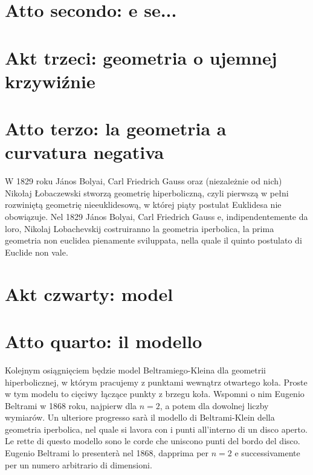 \section{Atto secondo: e se...} %





\section{Akt trzeci: geometria o ujemnej krzywiźnie} %
\section{Atto terzo: la geometria a curvatura negativa} %
W 1829 roku János Bolyai, Carl Friedrich Gauss oraz (niezależnie od nich) Nikołaj Łobaczewski stworzą geometrię hiperboliczną, czyli pierwszą w pełni rozwiniętą geometrię nieeuklidesową, w której piąty postulat Euklidesa nie obowiązuje. %
Nel 1829 János Bolyai, Carl Friedrich Gauss e, indipendentemente da loro, Nikolaj Lobachevskij costruiranno la geometria iperbolica, la prima geometria non euclidea pienamente sviluppata, nella quale il quinto postulato di Euclide non vale. %




\section{Akt czwarty: model} %
\section{Atto quarto: il modello} %
Kolejnym osiągnięciem będzie model Beltramiego-Kleina dla geometrii hiperbolicznej, w którym pracujemy z punktami wewnątrz otwartego koła. %
Proste w tym modelu to cięciwy łączące punkty z brzegu koła. %
Wspomni o nim Eugenio Beltrami w 1868 roku, najpierw dla $n = 2$, a potem dla dowolnej liczby wymiarów. %
Un ulteriore progresso sarà il modello di Beltrami-Klein della geometria iperbolica, nel quale si lavora con i punti all'interno di un disco aperto. %
Le rette di questo modello sono le corde che uniscono punti del bordo del disco. %
Eugenio Beltrami lo presenterà nel 1868, dapprima per $n=2$ e successivamente per un numero arbitrario di dimensioni. %


